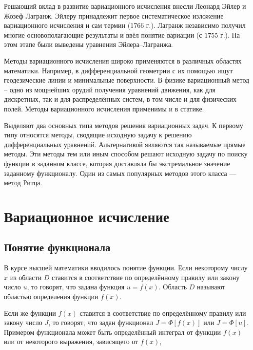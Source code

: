\documentclass{article}
\begin{document}
Решающий вклад в развитие вариационного исчисления внесли Леонард Эйлер и Жозеф Лагранж. Эйлеру принадлежит первое систематическое изложение вариационного исчисления и сам термин (1766 г.). Лагранж независимо получил многие основополагающие результаты и ввёл понятие вариации (с 1755 г.). На этом этапе были выведены уравнения Эйлера--Лагранжа.

Методы вариационного исчисления широко применяются в различных областях математики. Например, в дифференциальной геометрии с их помощью ищут геодезические линии и минимальные поверхности. В физике вариационный метод -- одно из мощнейших орудий получения уравнений движения, как для дискретных, так и для распределённых систем, в том числе и для физических полей. Методы вариационного исчисления применимы и в статике.

Выделяют два основных типа методов решения вариационных задач. К первому типу относятся методы, сводящие исходную задачу к решению дифференциальных уравнений. Альтернативой являются так называемые прямые методы. Эти методы тем или иным способом решают исходную задачу по поиску функции в заданном классе, которая доставляла бы экстремальное значение заданному функционалу. Один из самых популярных методов этого класса — метод Ритца.


\newpage

\section{Вариационное исчисление}

\subsection{Понятие функционала}

В курсе высшей математики вводилось понятие функции. Если некоторому числу $x$ из области $D$ ставится в соответствие по определённому правилу или закону число $u$, то говорят, 
что задана функция $u=f(x)$. Область $D$ называют областью определения функции $f(x)$.

Если же функции $f(x)$ ставится в соответствие по определённому правилу или закону число $J$, то говорят, что задан функционал $J = \Phi[f(x)]$ или 
$J = \Phi[u]$. Примером функционала может быть определённый интеграл от функции $f(x)$ или от некоторого выражения, зависящего от $f(x)$,
\end{document}
